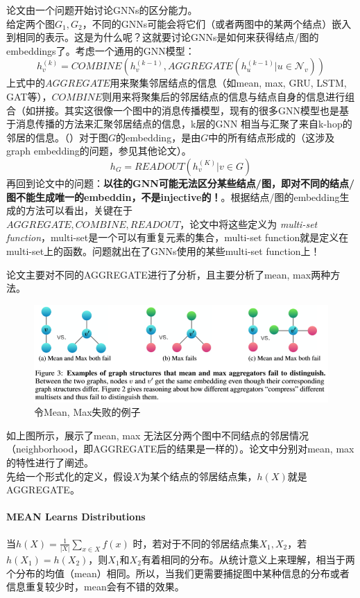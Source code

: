 论文由一个问题开始讨论GNNs的区分能力。\\
给定两个图$G_1, G_2$，不同的GNNs可能会将它们（或者两图中的某两个结点）嵌入到相同的表示。这是为什么呢？这就要讨论GNNs是如何来获得结点/图的embeddings了。考虑一个通用的GNN模型：
$$
h_v^{(k)} = COMBINE(h_v^{(k-1)},  AGGREGATE({h_u^{(k-1)} | u \in \mathcal{N}_v } ) )
$$
上式中的$AGGREGATE$用来聚集邻居结点的信息（如mean, max, GRU, LSTM, GAT等），$COMBINE$则用来将聚集后的邻居结点的信息与结点自身的信息进行组合（如拼接。其实这很像一个图中的消息传播模型，现有的很多GNN模型也是基于消息传播的方法来汇聚邻居结点的信息，k层的GNN 相当与汇聚了来自k-hop的邻居的信息。（{\color{red}{能否使用其他的框架来构建GNN模型呢？}}）对于图$G$的embedding，是由$G$中的所有结点形成的（这涉及graph embedding的问题，参见其他论文）。
$$
h_G = READOUT(h_v^{(K)} | v \in G)
$$
再回到论文中的问题：\textbf{以往的GNN可能无法区分某些结点/图，即对不同的结点/图不能生成唯一的embeddin，不是injective的！}。根据结点/图的embedding生成的方法可以看出，关键在于\\
$AGGREGATE, COMBINE, READOUT$，论文中将这些定义为 \textit{multi-set function}，multi-set是一个可以有重复元素的集合，multi-set function就是定义在multi-set上的函数。问题就出在了GNNs使用的某些multi-set function上！
\par 论文主要对不同的AGGREGATE进行了分析，且主要分析了mean, max两种方法。
\begin{figure}[h]
    \centering
    \includegraphics[width=1.\textwidth]{pics/mean-max.png}
    \caption{令Mean, Max失败的例子}
\end{figure}
如上图所示，展示了mean, max 无法区分两个图中不同结点的邻居情况（neighborhood，即AGGREGATE后的结果是一样的）。论文中分别对mean, max的特性进行了阐述。\\
先给一个形式化的定义，假设$X$为某个结点的邻居结点集，$h(X)$就是AGGREGATE。
\paragraph{MEAN Learns Distributions} 当$h(X) = \frac{1}{|X|}\sum_{x\in X} f(x)$ 时，若对于不同的邻居结点集$X_1, X_2$，若$h(X_1) = h(X_2)$，则$X_1$和$X_2$有着相同的分布。从统计意义上来理解，相当于两个分布的均值（mean）相同。所以，当我们更需要捕捉图中某种信息的分布或者信息重复较少时，mean会有不错的效果。

